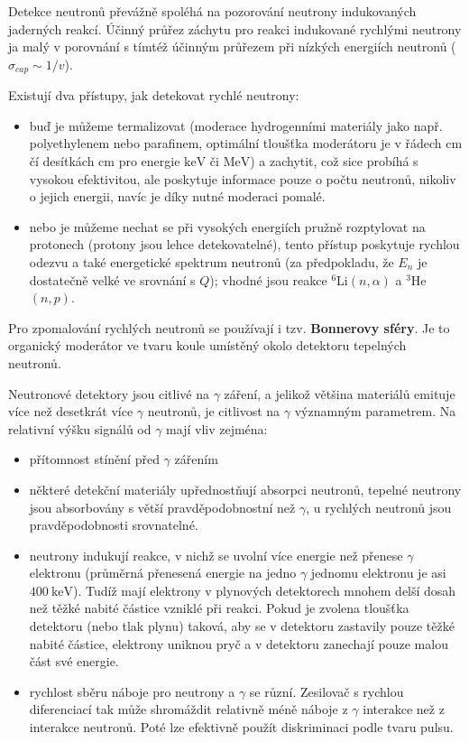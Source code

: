 \documentclass[../../main.tex]{subfiles}
\begin{document}
Detekce neutronů převážně spoléhá na pozorování neutrony indukovaných jaderných reakcí. Účinný průřez záchytu pro reakci indukované rychlými neutrony ja malý v porovnání s tímtéž účinným průřezem při nízkých energiích neutronů ($\sigma _{cap} \sim 1/v$).

Existují dva přístupy, jak detekovat rychlé neutrony:
\begin{itemize}
	\item buď je můžeme termalizovat (moderace hydrogenními materiály jako např. polyethylenem nebo parafinem, optimální tloušťka moderátoru je v řádech $\mathrm{cm}$ čí desítkách $\mathrm{cm}$ pro energie $\mathrm{keV}$ či $\mathrm{MeV}$) a zachytit, což sice probíhá s vysokou efektivitou, ale poskytuje informace pouze o počtu neutronů, nikoliv o jejich energii, navíc je díky nutné moderaci pomalé.
	
	\item nebo je můžeme nechat se při vysokých energiích pružně rozptylovat na protonech (protony jsou lehce detekovatelné), tento přístup poskytuje rychlou odezvu a  také energetické spektrum neutronů (za předpokladu, že $E_n$ je dostatečně velké ve srovnání s $Q$); vhodné jsou reakce $^{6}$Li$(n, \alpha)$ a $^{3}$He$(n,p)$. 
\end{itemize}

Pro zpomalování rychlých neutronů se používají i tzv. \textbf{Bonnerovy sféry}. Je to organický moderátor ve tvaru koule umístěný okolo detektoru tepelných neutronů.

Neutronové detektory jsou citlivé na $\gamma$ záření, a jelikož většina materiálů emituje více než desetkrát více $\gamma$ neutronů, je citlivost na $\gamma$ významným parametrem. Na relativní výšku signálů od $\gamma$ mají vliv zejména:
\begin{itemize}
	\item přítomnost stínění před $\gamma$ zářením
	\item některé detekční materiály upřednostňují absorpci neutronů, tepelné neutrony jsou absorbovány s větší pravděpodobnostní než $\gamma$, u rychlých neutronů jsou pravděpodobnosti srovnatelné.
	\item neutrony indukují reakce, v nichž se uvolní více energie než přenese $\gamma$ elektronu (průměrná přenesená energie na jedno $\gamma$ jednomu elektronu je asi $400 ~\mathrm{keV}$). Tudíž mají elektrony v plynových detektorech mnohem delší dosah než těžké nabité částice vzniklé při reakci. Pokud je zvolena tloušťka detektoru (nebo tlak plynu) taková, aby se  v detektoru zastavily pouze těžké nabité částice, elektrony uniknou pryč a v detektoru zanechají pouze malou část své energie.
	\item rychlost sběru náboje pro neutrony a $\gamma$ se různí. Zesilovač s rychlou diferenciací tak může shromáždit relativně méně náboje z $\gamma$ interakce než z interakce neutronů. Poté lze efektivně použít diskriminaci podle tvaru pulsu. 
\end{itemize}
\end{document}
